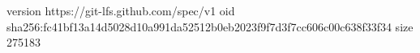 version https://git-lfs.github.com/spec/v1
oid sha256:fc41bf13a14d5028d10a991da52512b0eb2023f9f7d3f7cc606c00c638f33f34
size 275183

